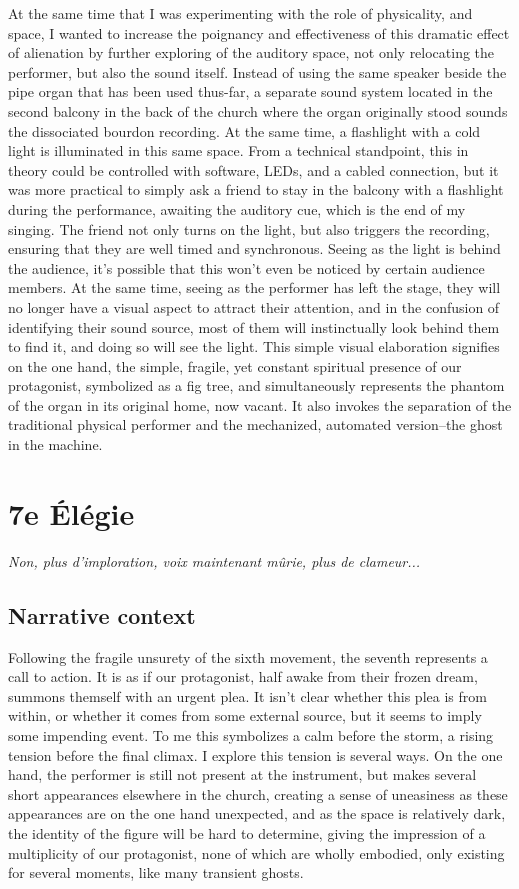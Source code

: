 \documentclass[12pt,twoside,maitrise]{dms_ks}
\theoremstyle{definition}
\begin{document}
At the same time that I was experimenting with the role of physicality, and space, I wanted to increase the poignancy and effectiveness of this dramatic effect of alienation by further exploring of the auditory space, not only relocating the performer, but also the sound itself.
Instead of using the same speaker beside the pipe organ that has been used thus-far, a separate sound system located in the second balcony in the back of the church where the organ originally stood sounds the dissociated bourdon recording.
At the same time, a flashlight with a cold light is illuminated in this same space.
From a technical standpoint, this in theory could be controlled with software, LEDs, and a cabled connection, but it was more practical to simply ask a friend to stay in the balcony with a flashlight during the performance, awaiting the auditory cue, which is the end of my singing.
The friend not only turns on the light, but also triggers the recording, ensuring that they are well timed and synchronous.
Seeing as the light is behind the audience, it's possible that this won't even be noticed by certain audience members.
At the same time, seeing as the performer has left the stage, they will no longer have a visual aspect to attract their attention, and in the confusion of identifying their sound source, most of them will instinctually look behind them to find it, and doing so will see the light.
This simple visual elaboration signifies on the one hand, the simple, fragile, yet constant spiritual presence of our protagonist, symbolized as a fig tree, and simultaneously represents the phantom of the organ in its original home, now vacant.
It also invokes the separation of the traditional physical performer and the mechanized, automated version--the ghost in the machine.

\section{7e Élégie}

\epigraph{\textit{Non, plus d’imploration, voix maintenant mûrie, plus de clameur...}}{}

\subsection{Narrative context}

Following the fragile unsurety of the sixth movement, the seventh represents a call to action.
It is as if our protagonist, half awake from their frozen dream, summons themself with an urgent plea.
It isn't clear whether this plea is from within, or whether it comes from some external source, but it seems to imply some impending event.
To me this symbolizes a calm before the storm, a rising tension before the final climax.
I explore this tension is several ways.
On the one hand, the performer is still not present at the instrument, but makes several short appearances elsewhere in the church, creating a sense of uneasiness as these appearances are on the one hand unexpected, and as the space is relatively dark, the identity of the figure will be hard to determine, giving the impression of a multiplicity of our protagonist, none of which are wholly embodied, only existing for several moments, like many transient ghosts.
\end{document}

